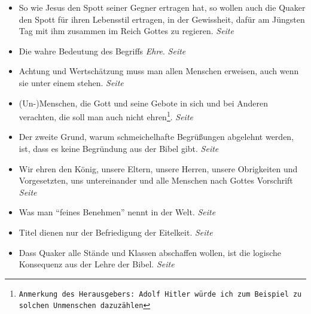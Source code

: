 \begin{itemize}
\begin{itemize}
 \item So wie Jesus den Spott seiner Gegner ertragen hat, so wollen auch die
Quaker den Spott für ihren Lebensstil ertragen, in der Gewissheit, dafür am
Jüngsten Tag mit ihm zusammen im Reich Gottes zu regieren.
 \dotfill \textit{Seite~\pageref{ref:09_10_spott}}\\

 \item Die wahre Bedeutung des Begriffs \textit{Ehre}.
 \dotfill \textit{Seite~\pageref{ref:09_12_ehre}}\\

 \item Achtung und Wertschätzung muss man allen Menschen erweisen, auch wenn sie
unter einem stehen.
 \dotfill \textit{Seite~\pageref{ref:09_18_ehre}}\\

 \item (Un-)Menschen, die Gott und seine Gebote in sich und bei Anderen
verachten, die soll man auch nicht ehren\footnote{\texttt{Anmerkung des
Herausgebers: Adolf Hitler würde ich zum Beispiel zu solchen Unmenschen dazuzählen}}.
 \dotfill \textit{Seite~\pageref{ref:09_19_ehre}}\\

 \item Der zweite Grund, warum schmeichelhafte Begrüßungen abgelehnt werden, ist,
dass es keine Begründung aus der Bibel gibt.
 \dotfill \textit{Seite~\pageref{ref:09_20_zeiter_grund}}\\

 \item Wir ehren den König, unsere Eltern,
unsere Herren, unsere Obrigkeiten
und Vorgesetzten, uns untereinander und alle
Menschen nach Gottes Vorschrift
 \dotfill \textit{Seite~\pageref{ref:09_20_koenig}}\\

 \item Was man "`feines Benehmen"' nennt in der Welt.
 \dotfill \textit{Seite~\pageref{ref:09_26_feines_benemen}}\\

 \item Titel dienen nur der Befriedigung der Eitelkeit.
 \dotfill \textit{Seite~\pageref{ref:09_31_heuchelei}}\\

 \item Dass Quaker alle Stände und Klassen abschaffen wollen, ist die logische
Konsequenz aus der Lehre der Bibel.
 \dotfill \textit{Seite
\pageref{ref:09_35_staende_abschaffen}}\\


\end{itemize}
\end{itemize}
